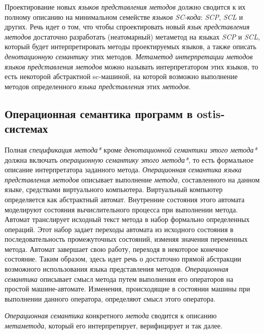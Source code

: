 \begin{textitemize}
    \item Проектирование новых \textit{языков представления методов} должно сводится к их полному описанию на минимальном семействе \textit{языков SC-кода}: \textit{SCP}, \textit{SCL} и других. Речь идет о том, что чтобы спроектировать новый \textit{язык представления методов} достаточно разработать (неатомарный) метаметод на языках \textit{SCP} и \textit{SCL}, который будет интерпретировать методы проектируемых языков, а также описать \textit{денотационную семантику} этих методов. \textit{Метаметод интерпретации методов языков представления методов} можно называть интерпретатором этих языков, то есть некоторой абстрактной sc-машиной, на которой возможно выполнение методов определенного \textit{языка представления} этих \textit{методов}.
\end{textitemize}

\subsection{Операционная семантика программ в ostis-системах}
\label{sec_programs_method_op_semantic}

Полная \textit{спецификация метода*} кроме \textit{денотационной семантики этого метода*} должна включать \textit{операционную семантику этого метода*}, то есть формальное описание интерпретатора заданного метода. \textit{Операционная семантика языка представления методов} описывает выполнение \textit{метода}, составленного на данном языке, средствами виртуального компьютера. Виртуальный компьютер определяется как абстрактный автомат. Внутренние состояния этого автомата моделируют состояния вычислительного процесса при выполнении метода. Автомат транслирует исходный текст метода в набор формально определенных операций. Этот набор задает переходы автомата из исходного состояния в последовательность промежуточных состояний, изменяя значения переменных метода. Автомат завершает свою работу, переходя в некоторое конечное состояние. Таким образом, здесь идет речь о достаточно прямой абстракции возможного использования языка представления методов. \textit{Операционная семантика} описывает смысл метода путем выполнения его операторов на простой машине-автомате. Изменения, происходящие в состоянии машины при выполнении данного оператора, определяют смысл этого оператора.

\textit{Операционная семантика} конкретного \textit{метода} сводится к описанию \textit{метаметода}, который его интерпретирует, верифицирует и так далее.

